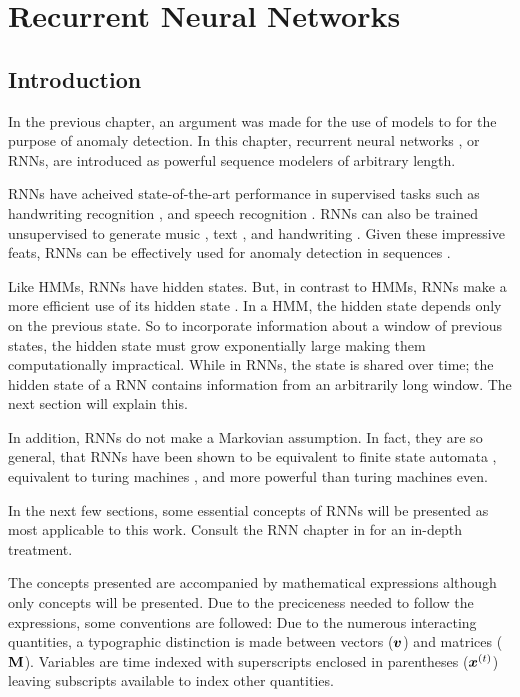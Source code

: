 
\chapter[]{Recurrent Neural Networks}

\section{Introduction}

In the previous chapter, an argument was made for the use of models to for the purpose of anomaly detection. In this chapter, recurrent neural networks \cite{Rumelhart1986}, or RNNs, are introduced as powerful sequence modelers of arbitrary length.

RNNs have acheived state-of-the-art performance in supervised tasks such as handwriting recognition \cite{Graves2009}, and speech recognition  \cite{Graves2013}. RNNs can also be trained unsupervised to generate  music  \cite{Boulanger-Lewandowski2012}, text \cite{Martens2011a,Graves2013b}, and handwriting \cite{Graves2013b}. Given these impressive feats, RNNs can be effectively used for anomaly detection in sequences \cite{Marchi2015,Malhotra2015}.

Like HMMs, RNNs have hidden states. But, in contrast to HMMs, RNNs make a more efficient use of its hidden state \cite{ZacharyC.Lipton2015}. In a HMM, the hidden state depends only on the previous state. So to incorporate information about a window of previous states, the hidden state must grow exponentially large making them computationally impractical. While in RNNs, the state is shared over time; the hidden state of a RNN contains information from an arbitrarily long window. The next section will explain this.

In addition, RNNs do not make a Markovian assumption. In fact, they are so general, that RNNs have been shown to be equivalent to finite state automata \cite{Minsky1967}, equivalent to turing machines \cite{Siegelmann1995}, and more powerful than turing machines \cite{Siegelmann1993} even.

In the next few sections, some essential concepts of RNNs will be presented as most applicable to this work. Consult the RNN chapter in \cite{Bengio-et-al-2015-Book} for an in-depth treatment.

The concepts presented are accompanied by mathematical expressions although only concepts will be presented. Due to the preciceness needed to follow the expressions, some conventions are followed: Due to the numerous interacting quantities, a typographic distinction is made between vectors ($\boldsymbol{v}$) and  matrices ($\mathbf{M}$). Variables are time indexed with superscripts enclosed in parentheses ($\boldsymbol{x}^{(t)}$) leaving subscripts available to index other quantities.

